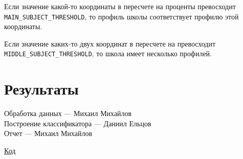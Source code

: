 \documentclass{article}
\begin{document}
Если значение какой-то координаты в пересчете на проценты превосходит 
\texttt{MAIN\_SUBJECT\_THRESHOLD}, то профиль школы соответствует профилю этой координаты. 

Если значение каких-то двух координат в пересчете на превосходит \texttt{MIDDLE\_SUBJECT\_THRESHOLD}, то школа имеет несколько профилей.

\section{Результаты}
Обработка данных --- Михаил Михайлов\\
Построение классификатора --- Даниил Ельцов\\
Отчет --- Михаил Михайлов

\href{https://github.com/Desiment/ml-study/tree/main/classification-tree}{Код}
\end{document}
